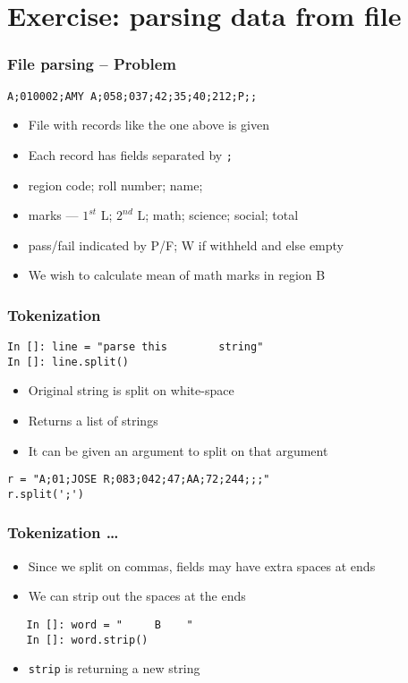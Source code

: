 \documentclass[14pt,compress]{beamer}
\begin{document}
\section{Exercise: parsing data from file}

\begin{frame}
  \frametitle{File parsing -- Problem}
  \begin{lstlisting}
A;010002;AMY A;058;037;42;35;40;212;P;;
  \end{lstlisting}
  \begin{itemize}
  \item File with records like the one above is given
  \item Each record has fields separated by \verb+;+
  \item region code; roll number; name;
  \item marks --- $1^{st}$ L; $2^{nd}$ L; math; science; social; total
  \item pass/fail indicated by P/F; W if withheld and else empty
    \end{itemize}

  \begin{itemize}
  \item We wish to calculate mean of math marks in region B
  \end{itemize}
\end{frame}

\begin{frame}[fragile]
  \frametitle{Tokenization}
  \begin{lstlisting}
In []: line = "parse this        string"
In []: line.split()
  \end{lstlisting}
  \begin{itemize}
  \item Original string is split on white-space
  \item Returns a list of strings
  \item It can be given an argument to split on that argument
  \end{itemize}
  \begin{lstlisting}
r = "A;01;JOSE R;083;042;47;AA;72;244;;;"
r.split(';')
  \end{lstlisting}
\end{frame}

\begin{frame}[fragile]
  \frametitle{Tokenization \ldots}
  \begin{itemize}
  \item Since we split on commas, fields may have extra spaces at ends
  \item We can strip out the spaces at the ends
  \end{itemize}
  \begin{lstlisting}
   In []: word = "     B    "
   In []: word.strip()
  \end{lstlisting}
  \begin{itemize}
  \item \texttt{strip} is returning a new string
  \end{itemize}
\end{frame}
\end{document}
